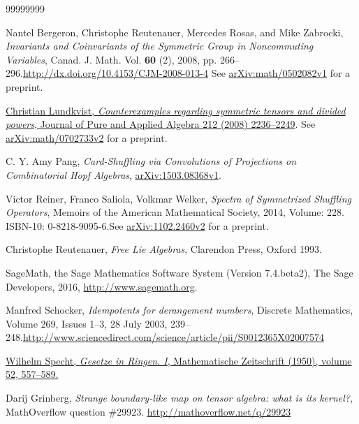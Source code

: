 \documentclass[numbers=enddot,12pt,final,onecolumn,notitlepage]{scrartcl}%
\theoremstyle{definition}
\begin{document}
\begin{thebibliography}{99999999}                                                                                         %


Nantel Bergeron, Christophe Reutenauer, Mercedes
Rosas, and Mike Zabrocki, \textit{Invariants and Coinvariants of the Symmetric
Group in Noncommuting Variables}, Canad. J. Math. Vol. \textbf{60} (2), 2008,
pp. 266--296.\newline\url{http://dx.doi.org/10.4153/CJM-2008-013-4}\newline
See \href{https://arxiv.org/abs/math/0502082v1}{arXiv:math/0502082v1} for a preprint.

%
\href{http://www.sciencedirect.com/science/article/pii/S0022404908000510}{Christian
Lundkvist, \textit{Counterexamples regarding symmetric tensors and divided
powers}, Journal of Pure and Applied Algebra 212 (2008) 2236--2249}. See
\href{http://arxiv.org/pdf/math/0702733v2.pdf}{arXiv:math/0702733v2} for a preprint.

C. Y. Amy Pang, \textit{Card-Shuffling via Convolutions
of Projections on Combinatorial Hopf Algebras},\newline%
\href{http://arxiv.org/abs/1503.08368v1}{arXiv:1503.08368v1}.

Victor Reiner, Franco Saliola, Volkmar Welker,
\textit{Spectra of Symmetrized Shuffling Operators}, Memoirs of the American
Mathematical Society, 2014, Volume: 228. ISBN-10: 0-8218-9095-6.\newline See
\href{http://arxiv.org/abs/1102.2460v2}{arXiv:1102.2460v2} for a preprint.

Christophe Reutenauer, \textit{Free Lie Algebras},
Clarendon Press, Oxford 1993.

SageMath, the Sage Mathematics Software System (Version
7.4.beta2), The Sage Developers, 2016, \url{http://www.sagemath.org}.

Manfred Schocker, \textit{Idempotents for
derangement numbers}, Discrete Mathematics, Volume 269, Issues 1--3, 28 July
2003, 239--248.\newline\url{http://www.sciencedirect.com/science/article/pii/S0012365X02007574}

\href{https://eudml.org/doc/169134}{Wilhelm Specht,
\textit{Gesetze in Ringen. I}, Mathematische Zeitschrift (1950), volume 52,
557--589.}

Darij Grinberg, \textit{Strange boundary-like map on
tensor algebra: what is its kernel?}, MathOverflow question \#29923.\newline%
\url{
http://mathoverflow.net/q/29923}
\end{thebibliography}
\end{document}
